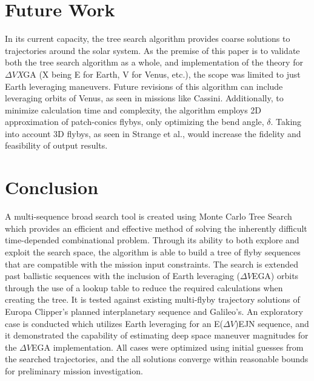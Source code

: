 \documentclass[letterpaper, preprint, paper,11pt]{AAS}	%
\begin{document}
\section*{Future Work}

In its current capacity, the tree search algorithm provides coarse solutions to trajectories around the solar system. As the premise of this paper is to validate both the tree search algorithm as a whole, and implementation of the theory for $\Delta V$\textit{X}GA (X being E for Earth, V for Venus, etc.), the scope was limited to just Earth leveraging maneuvers. Future revisions of this algorithm can include leveraging orbits of Venus, as seen in missions like Cassini. Additionally, to minimize calculation time and complexity, the algorithm employs 2D approximation of patch-conics flybys, only optimizing the bend angle, $\delta$. Taking into account 3D flybys, as seen in Strange et al.\cite{Strange2008}, would increase the fidelity and feasibility of output results.

\section*{Conclusion}

A multi-sequence broad search tool is created using Monte Carlo Tree Search which provides an efficient and effective method of solving the inherently difficult time-depended combinational problem. Through its ability to both explore and exploit the search space, the algorithm is able to build a tree of flyby sequences that are compatible with the mission input constraints. The search is extended past ballistic sequences with the inclusion of Earth leveraging ($\Delta V$EGA) orbits through the use of a lookup table to reduce the required calculations when creating the tree. It is tested against existing multi-flyby trajectory solutions of Europa Clipper's planned interplanetary sequence and Galileo's. An exploratory case is conducted which utilizes Earth leveraging for an E($\Delta V$)EJN sequence, and it demonstrated the capability of estimating deep space maneuver magnitudes for the $\Delta V$EGA implementation. All cases were optimized using initial guesses from the searched trajectories, and the all solutions converge within reasonable bounds for preliminary mission investigation.
\end{document}
